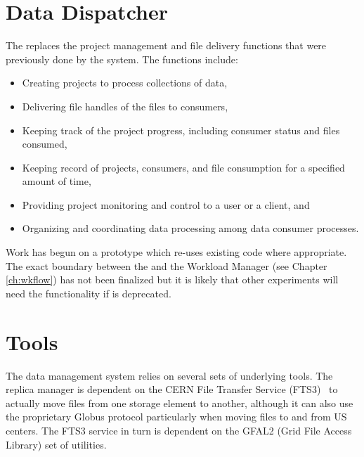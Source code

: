 \documentclass[../main-v1.tex]{subfiles}
\begin{document}
\section{Data Dispatcher }

The  replaces the project management and file delivery functions that were previously done by the  system.  The  functions include:
\begin{itemize}
    \item Creating projects to process collections of data,
    
    \item Delivering file handles of the files to consumers,
    
    \item Keeping track of the project progress, including consumer status and files consumed,
    
    \item Keeping record of projects, consumers, and file consumption for a specified amount of time,
    
    \item Providing project monitoring and control to a user or a client, and
    
    \item Organizing and coordinating data processing among data consumer processes.

\end{itemize}

Work has begun on a prototype  which re-uses existing  code where appropriate.  The exact boundary between the  and the Workload Manager (see Chapter \ref{ch:wkflow}) has not been finalized but it is likely that other  experiments will need the  functionality if  is deprecated. 



\section{Tools }

The data management system relies on several sets of underlying tools.  The  replica manager is dependent on the CERN File Transfer Service (FTS3)~\cite{Kiryanov:2015fts} to actually move files from one storage element to another, although it can also use the proprietary
Globus protocol 
particularly when moving files to and from US  centers.  The FTS3 service in turn is dependent on the
GFAL2 (Grid File Access Library) set of utilities.
\end{document}

